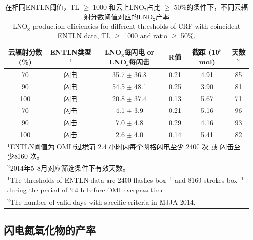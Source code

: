 \begin{table}[htbp]
\scriptsize
\caption{在相同ENTLN阈值，TL $\geq$ 1000 和云上LNO$_2$占比 $\geq$ 50\%的条件下，不同云辐射分数阈值对应的LNO$_\textrm{x}$产率 \\ LNO$_\textrm{x}$ production efficiencies for different thresholds of CRF with coincident ENTLN data, TL $\geq$ 1000 and ratio $\geq$ 50\%.}
\begin{tabular}{cccccc}
\hline
\textbf{云辐射分数 (\%)} & \textbf{ENTLN类型$^1$} & \textbf{LNO$_\textrm{x}$每闪电 or LNO$_\textrm{x}$每闪击} & \textbf{R值} & \textbf{截距 (10$^{5}$mol)} & \textbf{天数$^2$} \\
\hline
70  & 闪电  & 35.7  $\pm$ 36.8 & 0.21 & 4.91 & 85 \\
90  & 闪电  & 54.5  $\pm$ 48.1 & 0.25 & 3.90 & 81 \\
100 & 闪电  & 20.8  $\pm$ 37.4 & 0.13 & 5.67 & 71 \\
70  & 闪击 & 4.1   $\pm$ 3.9  & 0.21 & 5.16 & 96 \\
90  & 闪击 & 7.0   $\pm$ 4.8  & 0.29 & 4.16 & 93 \\
100 & 闪击 & 2.6   $\pm$ 4.0  & 0.14 & 5.41 & 82 \\
\hline
\multicolumn{6}{l}{$^1$ENTLN阈值为 OMI f过境前 2.4 小时内每个网格闪电至少 2400 次 或 闪击至少8160 次。}\\
\multicolumn{6}{l}{$^2$2014年5--8月对应筛选条件下有效天数。} \\
\multicolumn{6}{l}{$^1$The thresholds of ENTLN data are 2400 flashes box$^{-1}$ and 8160 strokes box$^{-1}$ during the period of 2.4 h before OMI overpass time.}\\
\multicolumn{6}{l}{$^2$The number of valid days with specific criteria in MJJA 2014.}
\end{tabular}
\label{table:CRFs}
\end{table}

\subsection{闪电氮氧化物的产率}

